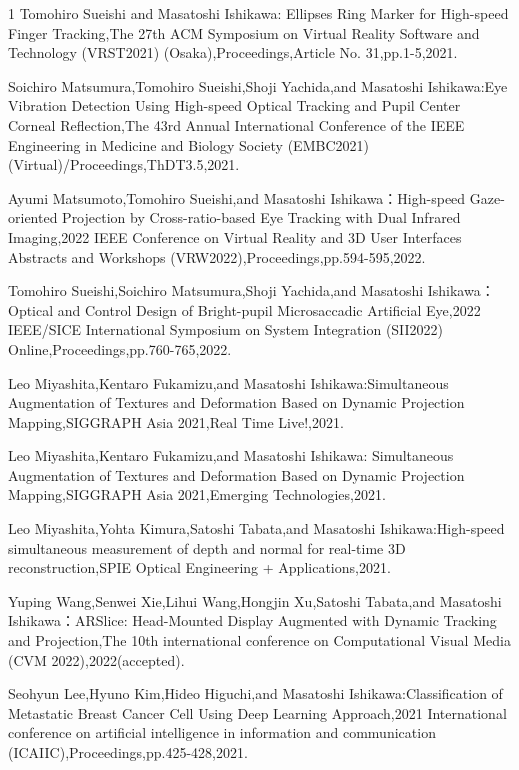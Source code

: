 \begin{査読付}{1}
Tomohiro Sueishi and Masatoshi Ishikawa:  Ellipses Ring Marker for High-speed Finger Tracking,The 27th ACM Symposium on Virtual Reality Software and Technology (VRST2021) (Osaka),Proceedings,Article No. 31,pp.1-5,2021.


Soichiro Matsumura,Tomohiro Sueishi,Shoji Yachida,and Masatoshi Ishikawa:Eye Vibration Detection Using High-speed Optical Tracking and Pupil Center Corneal Reflection,The 43rd Annual International Conference of the IEEE Engineering in Medicine and Biology Society (EMBC2021) (Virtual)/Proceedings,ThDT3.5,2021.

Ayumi Matsumoto,Tomohiro Sueishi,and Masatoshi Ishikawa：High-speed Gaze-oriented Projection by Cross-ratio-based Eye Tracking with Dual Infrared Imaging,2022 IEEE Conference on Virtual Reality and 3D User Interfaces Abstracts and Workshops (VRW2022),Proceedings,pp.594-595,2022.

Tomohiro Sueishi,Soichiro Matsumura,Shoji Yachida,and Masatoshi Ishikawa： Optical and Control Design of Bright-pupil Microsaccadic Artificial Eye,2022 IEEE/SICE International Symposium on System Integration (SII2022) Online,Proceedings,pp.760-765,2022.

Leo Miyashita,Kentaro Fukamizu,and Masatoshi Ishikawa:Simultaneous Augmentation of Textures and Deformation Based on Dynamic Projection Mapping,SIGGRAPH Asia 2021,Real Time Live!,2021.

Leo Miyashita,Kentaro Fukamizu,and Masatoshi Ishikawa: Simultaneous Augmentation of Textures and Deformation Based on Dynamic Projection Mapping,SIGGRAPH Asia 2021,Emerging Technologies,2021.

Leo Miyashita,Yohta Kimura,Satoshi Tabata,and Masatoshi Ishikawa:High-speed simultaneous measurement of depth and normal for real-time 3D reconstruction,SPIE Optical Engineering + Applications,2021.

Yuping Wang,Senwei Xie,Lihui Wang,Hongjin Xu,Satoshi Tabata,and Masatoshi Ishikawa：ARSlice: Head-Mounted Display Augmented with Dynamic Tracking and Projection,The 10th international conference on Computational Visual Media (CVM 2022),2022(accepted).

Seohyun Lee,Hyuno Kim,Hideo Higuchi,and Masatoshi Ishikawa:Classification of Metastatic Breast Cancer Cell Using Deep Learning Approach,2021 International conference on artificial intelligence in information and communication (ICAIIC),Proceedings,pp.425-428,2021.


\end{査読付}
